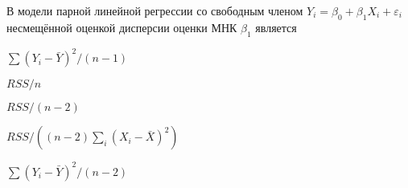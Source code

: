 
\begin{question}
В модели парной линейной регрессии со свободным членом
\(Y_i = \beta_0 + \beta_1 X_i + \varepsilon_i\) несмещённой оценкой
дисперсии оценки МНК \(\hat\beta_1\) является
\begin{answerlist}
  \item \(\sum (Y_i - \bar Y)^2 / (n-1)\)
  \item \(RSS/n\)
  \item \(RSS/(n-2)\)
  \item \(RSS/((n-2)\sum_i (X_i - \bar X)^2)\)
  \item \(\sum (Y_i - \bar Y)^2 / (n-2)\)
\end{answerlist}
\end{question}


